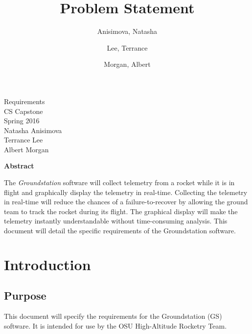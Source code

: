 \documentclass[10pt,journal,draftclsnofoot,onecolumn]{IEEEtran}
\begin{document}
	\singlespace
	
	\title{\vspace{2in}Problem Statement}
	
	\author {
		Anisimova, Natasha
		\and
		Lee, Terrance
		\and
		Morgan, Albert
	}
	
	
	\pagestyle{empty}
	\vspace*{2in}
	\begin{center}
		\huge
		Requirements\\
		\normalsize
		\vspace{5mm}
		CS Capstone\\
		Spring 2016\\
		\vspace{5mm}
		Natasha Anisimova\\
		Terrance Lee\\
		Albert Morgan
	\end{center}
	
	\vspace{5mm}
	
	\begin{center}
		\textbf{Abstract}
	\end{center}
	
	\begin{adjustwidth}{2in}{2in}
	
	The \textit{Groundstation} software will collect telemetry from a rocket while it is in flight and graphically display the telemetry in real-time.
	Collecting the telemetry in real-time will reduce the chances of a failure-to-recover by allowing the ground team to track the rocket during its flight.
	The graphical display will make the telemetry instantly understandable without time-consuming analysis.
	This document will detail the specific requirements of the Groundstation software.

	
	\end{adjustwidth}
	
	\newpage
	\pagestyle{headings}


	\section{Introduction}
	
	\subsection{Purpose}
	This document will specify the requirements for the Groundstation (GS) software.
	It is intended for use by the OSU High-Altitude Rocketry Team.
	
\end{document}
